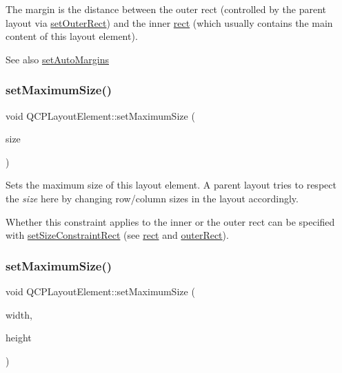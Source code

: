 The margin is the distance between the outer rect (controlled by the parent layout via \hyperlink{classQCPLayoutElement_a38975ea13e36de8e53391ce41d94bc0f}{set\+Outer\+Rect}) and the inner \hyperlink{classQCPLayoutElement_a208effccfe2cca4a0eaf9393e60f2dd4}{rect} (which usually contains the main content of this layout element).

\begin{DoxySeeAlso}{See also}
\hyperlink{classQCPLayoutElement_accfda49994e3e6d51ed14504abf9d27d}{set\+Auto\+Margins} 
\end{DoxySeeAlso}
\mbox{\label{classQCPLayoutElement_a74eb5280a737ab44833d506db65efd95}} 
\subsubsection{\texorpdfstring{set\+Maximum\+Size()}{setMaximumSize()}\hspace{0.1cm}{\footnotesize\ttfamily [1/2]}}
{\footnotesize\ttfamily void Q\+C\+P\+Layout\+Element\+::set\+Maximum\+Size (\begin{DoxyParamCaption}\item[{const Q\+Size \&}]{size }\end{DoxyParamCaption})}

Sets the maximum size of this layout element. A parent layout tries to respect the {\itshape size} here by changing row/column sizes in the layout accordingly.

Whether this constraint applies to the inner or the outer rect can be specified with \hyperlink{classQCPLayoutElement_a361666cdcc6fbfd37344cc44be746b0f}{set\+Size\+Constraint\+Rect} (see \hyperlink{classQCPLayoutElement_a208effccfe2cca4a0eaf9393e60f2dd4}{rect} and \hyperlink{classQCPLayoutElement_a2a32a12a6161c9dffbadeb9cc585510c}{outer\+Rect}). \mbox{\label{classQCPLayoutElement_a03e0e9c48f230217c529b0819f832d84}} 
\subsubsection{\texorpdfstring{set\+Maximum\+Size()}{setMaximumSize()}\hspace{0.1cm}{\footnotesize\ttfamily [2/2]}}
{\footnotesize\ttfamily void Q\+C\+P\+Layout\+Element\+::set\+Maximum\+Size (\begin{DoxyParamCaption}\item[{int}]{width,  }\item[{int}]{height }\end{DoxyParamCaption})}

